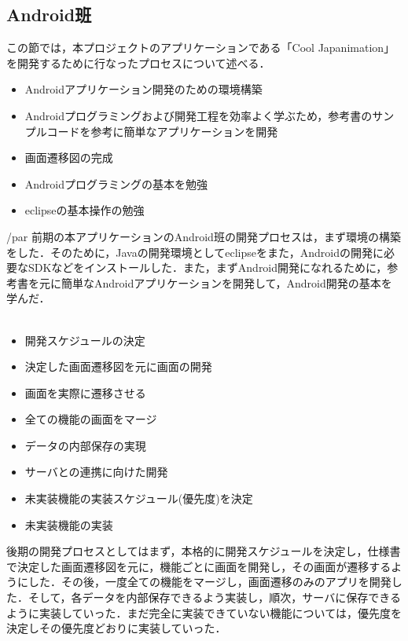 \subsection{Android班}
\par この節では，本プロジェクトのアプリケーションである「Cool Japanimation」を開発するために行なったプロセスについて述べる．

\begin{itemize}
\item Androidアプリケーション開発のための環境構築
\item Androidプログラミングおよび開発工程を効率よく学ぶため，参考書のサンプルコードを参考に簡単なアプリケーションを開発
\item 画面遷移図の完成
\item Androidプログラミングの基本を勉強
\item eclipseの基本操作の勉強
\end{itemize}

/par
前期の本アプリケーションのAndroid班の開発プロセスは，まず環境の構築をした．そのために，Javaの開発環境としてeclipseをまた，Androidの開発に必要なSDKなどをインストールした．また，まずAndroid開発になれるために，参考書を元に簡単なAndroidアプリケーションを開発して，Android開発の基本を学んだ．
\\
\\
\begin{itemize}
\item 開発スケジュールの決定
\item 決定した画面遷移図を元に画面の開発
\item 画面を実際に遷移させる
\item 全ての機能の画面をマージ
\item データの内部保存の実現
\item サーバとの連携に向けた開発
\item 未実装機能の実装スケジュール(優先度)を決定
\item 未実装機能の実装
\end{itemize}

\par
後期の開発プロセスとしてはまず，本格的に開発スケジュールを決定し，仕様書で決定した画面遷移図を元に，機能ごとに画面を開発し，その画面が遷移するようにした．その後，一度全ての機能をマージし，画面遷移のみのアプリを開発した．そして，各データを内部保存できるよう実装し，順次，サーバに保存できるように実装していった．まだ完全に実装できていない機能については，優先度を決定しその優先度どおりに実装していった．
